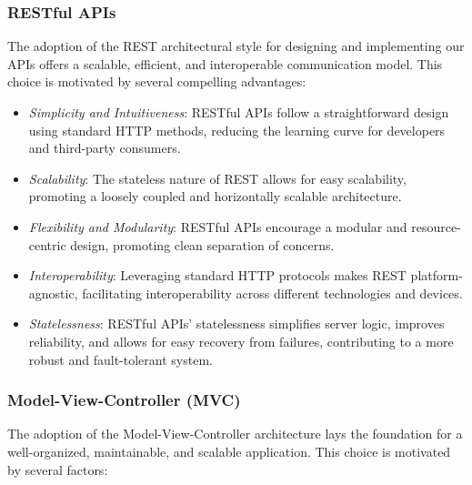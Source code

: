 \subsubsection*{RESTful APIs}

The adoption of the REST architectural style for designing and implementing our APIs offers a scalable, efficient, and interoperable communication model. This choice is motivated by several compelling advantages:

\begin{itemize}
    \item \textit{Simplicity and Intuitiveness}: RESTful APIs follow a straightforward design using standard HTTP methods, reducing the learning curve for developers and third-party consumers.
  
    \item \textit{Scalability}: The stateless nature of REST allows for easy scalability, promoting a loosely coupled and horizontally scalable architecture.
  
    \item \textit{Flexibility and Modularity}: RESTful APIs encourage a modular and resource-centric design, promoting clean separation of concerns.
  
    \item \textit{Interoperability}: Leveraging standard HTTP protocols makes REST platform-agnostic, facilitating interoperability across different technologies and devices.
  
    \item \textit{Statelessness}: RESTful APIs' statelessness simplifies server logic, improves reliability, and allows for easy recovery from failures, contributing to a more robust and fault-tolerant system.
\end{itemize}

\subsubsection*{Model-View-Controller (MVC)}

The adoption of the Model-View-Controller architecture lays the foundation for a well-organized, maintainable, and scalable application. This choice is motivated by several factors:

